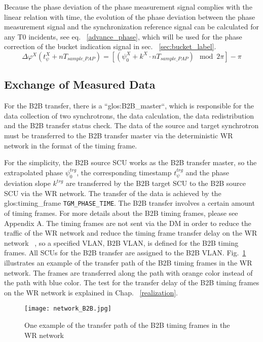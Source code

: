 Because the phase deviation of the phase measurement signal complies with the linear relation with time, the evolution of the phase deviation between the phase measurement signal and the synchronization reference signal can be calculated for any T0 incidents, see eq. ~\ref{advance_phase}, which will be used for the phase correction of the bucket indication signal in sec. ~\ref{sec:bucket_label}.
\begin{equation}
\label{advance_phase}
\Delta \varphi^\mathit{X}(t_\mathit{\psi}^\mathit{X}+nT_\mathit{sample\_PAP})=[(\psi^\mathit{X}_0+k^\mathit{X}\cdot nT_\mathit{sample\_PAP}) \mod 2\pi] - \pi
\end{equation}

\subsection{Exchange of Measured Data}

For the B2B transfer, there is a ``\gls{glos:B2B_master}``, which is responsible for the data collection of two synchrotrons, the data calculation, the data redistribution and the B2B transfer status check. The data of the source and target synchrotron must be transferred to the B2B transfer master via the deterministic WR network in the format of the timing frame.
 
For the simplicity, the B2B source SCU works as the B2B transfer master, so the extrapolated phase $\psi^\mathit{trg}_0$, the corresponding timestamp $t_\psi^\mathit{trg}$ and the phase deviation slope $k^\mathit{trg}$ are transferred by the B2B target SCU to the B2B source SCU via the WR network. The transfer of the data is achieved by the \gls{glos:timing_frame} \verb|TGM_PHASE_TIME|. The B2B transfer involves a certain amount of timing frames. For more details about the B2B timing frames, please see Appendix A. The timing frames are not sent via the DM in order to reduce the traffic of the WR network and reduce the timing frame transfer delay on the WR network ~\cite{bai_concept_2016}, so a specified VLAN, B2B \gls{VLAN}, is defined for the B2B timing frames. All SCUs for the B2B transfer are assigned to the B2B VLAN. Fig.~\ref{network_B2B} illustrates an example of the transfer path of the B2B timing frames in the WR network. The frames are transferred along the path with orange color instead of the path with blue color. The test for the transfer delay of the B2B timing frames on the WR network is explained in Chap. ~\ref{realization}.
 \begin{figure}[!htb]
   \centering   
   \texttt{[image: network\_B2B.jpg]}
   \caption{One example of the transfer path of the B2B timing frames in the WR network}
   \label{network_B2B}
\end{figure}

